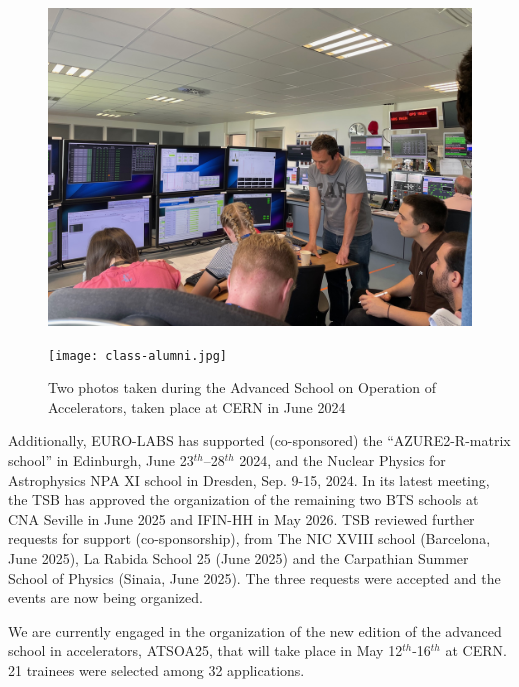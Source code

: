 \begin{figure}
    \centering
\begin{minipage}{0.49\textwidth}
        \centering
        \includegraphics[width=\textwidth]{sections/ISOLDE-class.jpg}
    \end{minipage}
    \hfill %
    \begin{minipage}{0.49\textwidth}
        \centering
        \texttt{[image: class-alumni.jpg]}
    \end{minipage}   
 \caption{Two photos taken during the Advanced School on Operation of Accelerators, taken place at CERN in June  2024 }
    \label{fig:ATSOA24}
\end{figure}


Additionally, EURO-LABS has supported (co-sponsored) the “AZURE2-R-matrix school” in Edinburgh, June  23$^{th}$–28$^{th}$ 2024, and the Nuclear Physics for Astrophysics NPA XI school in Dresden, Sep. 9-15, 2024. In its latest meeting, the TSB has approved the organization of the remaining two BTS schools at CNA Seville in June 2025 and IFIN-HH in May 2026. TSB reviewed further requests for support (co-sponsorship), from The NIC XVIII school (Barcelona, June 2025), La Rabida School 25 (June 2025) and the Carpathian Summer School of Physics (Sinaia, June 2025). The three requests were accepted and the events are now being organized.


We are currently engaged in the organization of the new edition 
of the advanced school in accelerators, ATSOA25, that will take place in May 12$^{th}$-16$^{th}$ at CERN. 
21 trainees were selected among 32 applications. %

